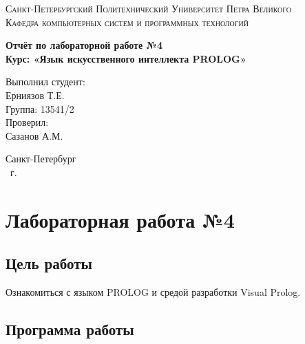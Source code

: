 \documentclass[14pt,a4paper,report]{report}
\begin{document}
\def\contentsname{Содержание}

\begin{titlepage}
	\begin{center}
		\textsc{Санкт-Петербургский Политехнический 
			Университет Петра Великого\\[5mm]
			Кафедра компьютерных систем и программных технологий}
		
		\vfill
		
		\textbf{Отчёт по лабораторной работе №4\\[3mm]
			Курс: «Язык искусственного интеллекта PROLOG»\\[41mm]
		}
	\end{center}
	
	\hfill
	\begin{minipage}{.4\textwidth}
		Выполнил студент:\\[2mm] 
		Ерниязов Т.Е.\\
		Группа: 13541/2\\[5mm]
		
		Проверил:\\[2mm] 
		Сазанов А.М.
	\end{minipage}
	\vfill
	\begin{center}
		Санкт-Петербург\\ \the\year\ г.
	\end{center}
\end{titlepage}

\tableofcontents
\clearpage

\chapter{Лабораторная работа №4}

\section{Цель работы}

Ознакомиться с языком PROLOG и средой разработки Visual Prolog.

\section{Программа работы}
\end{document}
